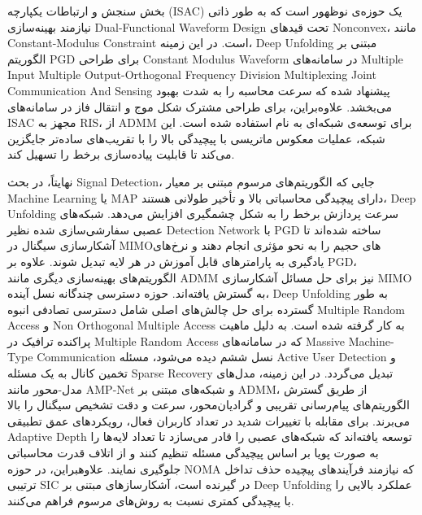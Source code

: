بخش سنجش و ارتباطات یکپارچه 
(\gls{ISAC})
 یک حوزه‌ی نوظهور است که به طور ذاتی نیازمند بهینه‌سازی 
\gls{Dual-Functional Waveform Design}
 تحت قیدهای 
\gls{Nonconvex}،
  مانند 
\gls{Constant-Modulus Constraint}
است. در این زمینه، 
\gls{Deep Unfolding}
مبتنی بر الگوریتم 
\gls{PGD}
 برای طراحی 
\gls{Constant Modulus Waveform}
 در سامانه‌های 
\gls{Multiple Input Multiple Output-Orthogonal Frequency Division Multiplexing}
\gls{Joint Communication And Sensing}
  پیشنهاد شده که سرعت محاسبه را به شدت بهبود می‌بخشد. علاوه‌براین، برای طراحی مشترک شکل موج و انتقال فاز در سامانه‌های 
\gls{ISAC}
  مجهز به 
\gls{RIS}،
 از 
\gls{ADMM}
  برای توسعه‌ی شبکه‌ای به نام 
   استفاده شده است. این شبکه، عملیات معکوس ماتریسی با پیچیدگی بالا را با تقریب‌های ساده‌تر جایگزین می‌کند تا قابلیت پیاده‌سازی برخط را تسهیل کند.
  
نهایتاً، در بحث 
\gls{Signal Detection}،
 جایی که الگوریتم‌های مرسوم مبتنی بر معیار
\gls{Machine Learning}
 یا 
\gls{MAP}
دارای پیچیدگی محاسباتی بالا و تأخیر طولانی هستند، 
\gls{Deep Unfolding}
 سرعت پردازش برخط را به شکل چشمگیری افزایش می‌دهد. شبکه‌های عصبی سفارشی‌سازی شده نظیر 
\gls{Detection Network}
 با 
\gls{PGD}
  ساخته شده‌اند تا آشکارسازی سیگنال در 
\gls{MIMO}‌های
   حجیم را به نحو مؤثری انجام دهند و نرخ‌های یادگیری به پارامترهای قابل آموزش در هر لایه تبدیل شوند. علاوه بر 
\gls{PGD}،
    الگوریتم‌های بهینه‌سازی دیگری مانند 
\gls{ADMM}
     نیز برای حل مسائل آشکارسازی 
\gls{MIMO}
      به 
     گسترش یافته‌اند. حوزه دسترسی چندگانه نسل آینده،
\gls{Deep Unfolding}
      به طور گسترده برای حل چالش‌های اصلی شامل دسترسی تصادفی انبوه 	
\gls{Multiple Random Access}
      و 
\gls{Non Orthogonal Multiple Access}
 به کار گرفته شده است.
 به دلیل ماهیت پراکنده ترافیک در 
\gls{Multiple Random Access}
 که در سامانه‌های 
\gls{Massive Machine-Type Communication}
 نسل ششم دیده می‌شود، مسئله 
\gls{Active User Detection}
  و تخمین کانال به یک مسئله
\gls{Sparse Recovery}
    تبدیل می‌گردد.
 در این زمینه، مدل‌های مدل-محور مانند
\gls{AMP-Net}
   و شبکه‌های مبتنی بر 
\gls{ADMM}،
  از طریق گسترش الگوریتم‌های پیام‌رسانی تقریبی و گرادیان‌محور، سرعت و دقت تشخیص سیگنال را بالا می‌برند. برای مقابله با تغییرات شدید در تعداد کاربران فعال، رویکردهای عمق تطبیقی 
\gls{Adaptive Depth}
   توسعه یافته‌اند که شبکه‌های عصبی را قادر می‌سازد تا تعداد لایه‌ها را به صورت پویا بر اساس پیچیدگی مسئله تنظیم کنند و از اتلاف قدرت محاسباتی جلوگیری نمایند.
 علاوهبراین، در حوزه 
\gls{NOMA}
  که نیازمند فرآیندهای پیچیده حذف تداخل ترتیبی 
\gls{SIC}
   در گیرنده است، آشکارسازهای مبتنی بر 
\gls{Deep Unfolding}
عملکرد بالایی را با پیچیدگی کمتری نسبت به روش‌های مرسوم فراهم می‌کنند.
 
